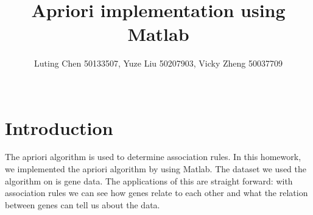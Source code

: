\documentclass[12pt]{article}
\title{ Apriori implementation using Matlab}
\author
{Luting Chen  50133507,
	Yuze Liu 50207903, 
	Vicky Zheng  50037709 \\
\\
}
\date{}
\newenvironment{sciabstract}{%
\begin{quote} \bf}
{\end{quote}}
\begin{document}
 


\baselineskip24pt


\maketitle 


\section*{Introduction}
The apriori algorithm is used to determine association rules. In this homework, we implemented the apriori algorithm by using Matlab. The dataset we used the algorithm on is gene data. The applications of this are straight forward: with association rules we can see how genes relate to each other and what the relation between genes can tell us about the data. 
\end{document}
